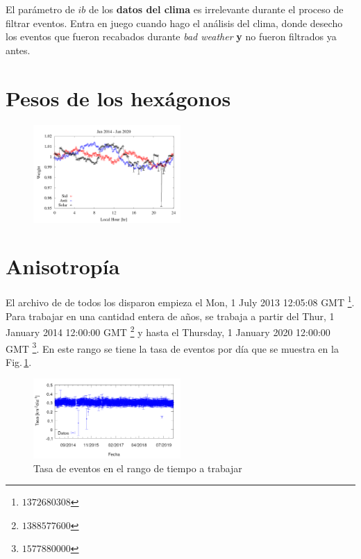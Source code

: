 El parámetro de $ib$ de los \textbf{datos del clima} es irrelevante durante el proceso de filtrar eventos. Entra en juego cuando hago el análisis del clima, donde desecho los eventos que fueron recabados durante \emph{bad weather} \textbf{y} no fueron filtrados ya antes.


\section{Pesos de los hexágonos}

\begin{figure}[H]
	\centering
	\includegraphics[width=0.5\textwidth]{weigth2014-2020_jan.png}
\end{figure}

\section{Anisotropía}


El archivo de de todos los disparon empieza el Mon, 1 July 2013 12:05:08 GMT \footnote{$1372680308$}. Para trabajar en una cantidad entera de años, se trabaja a partir del  Thur, 1 January 2014 12:00:00 GMT \footnote{$1388577600$} y hasta el Thursday, 1 January 2020 12:00:00 GMT \footnote{$1577880000$}.  En este rango se tiene la tasa de eventos por día que se muestra en la Fig.\,\ref{tasa_total_diaria}.


\begin{figure}[H]
	\centering
	\includegraphics[width=0.5\textwidth]{rate_total.png}
	\caption{Tasa  de eventos en el rango de tiempo a trabajar}
	\label{tasa_total_diaria}
\end{figure}


